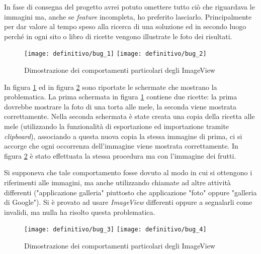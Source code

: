 In fase di consegna del progetto avrei potuto omettere tutto ciò che riguardava le immagini ma, anche se \textit{feature} incompleta, ho preferito lasciarlo.
Principalmente per dar valore al tempo speso alla ricerca di una soluzione ed in secondo luogo perché in ogni sito o libro di ricette vengono illustrate le foto dei risultati.

\begin{figure}[ht]
  \begin{center}
    \texttt{[image: definitivo/bug\_1]}
    \texttt{[image: definitivo/bug\_2]}
    \caption{Dimostrazione dei comportamenti particolari degli ImageView}
    \label{fig:bug_1}
  \end{center}
\end{figure}

In figura \ref{fig:bug_1} ed in figura \ref{fig:bug_2} sono riportate le schermate che mostrano la problematica.
La prima schermata in figura \ref{fig:bug_1} contiene due ricette: la prima dovrebbe mostrare la foto di una torta alle mele, la seconda viene mostrata correttamente.
Nella seconda schermata è state creata una copia della ricetta alle mele (utilizzando la funzionalità di esportazione ed importazione tramite \textit{clipboard}), associando a questa nuova copia la stessa immagine di prima, ci si accorge che ogni occorrenza dell'immagine viene mostrata correttamente.
In figura \ref{fig:bug_2} è stato effettuata la stessa procedura ma con l'immagine dei frutti.

Si supponeva che tale comportamento fosse dovuto al modo in cui si ottengono i riferimenti alle immagini, ma anche utilizzando chiamate ad altre attività differenti ("applicazione galleria" piuttosto che applicazione "foto" oppure "galleria di Google").
Si è provato ad usare \textit{ImageView} differenti oppure a segnalarli come invalidi, ma nulla ha risolto questa problematica.


\begin{figure}[ht]
  \begin{center}
    \texttt{[image: definitivo/bug\_3]}
    \texttt{[image: definitivo/bug\_4]}
    \caption{Dimostrazione dei comportamenti particolari degli ImageView}
    \label{fig:bug_2}
  \end{center}
\end{figure}

